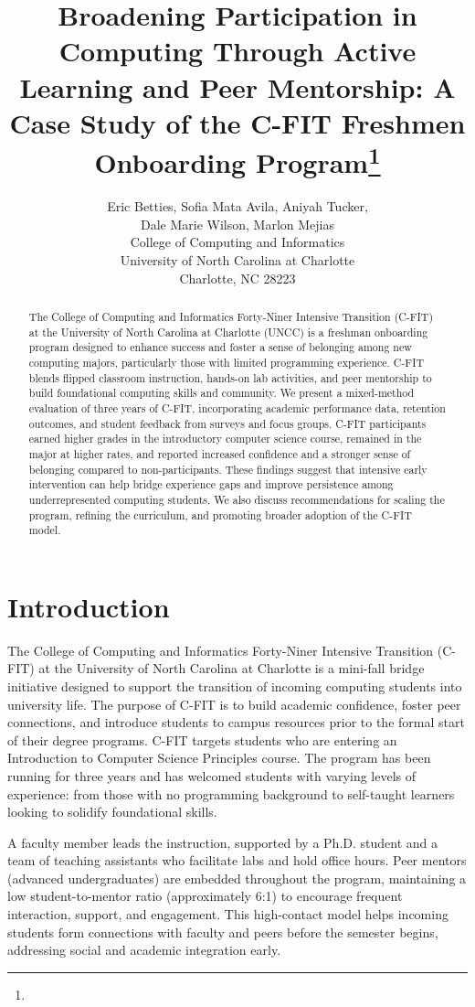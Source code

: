 \documentclass{article}
\title{Broadening Participation in Computing Through Active Learning and Peer Mentorship: A Case Study of the C-FIT Freshmen Onboarding Program\footnote{\protect}}
\author{
Eric Betties, Sofia Mata Avila, Aniyah Tucker,\\
Dale Marie Wilson, Marlon Mejias\\
College of Computing and Informatics\\
University of North Carolina at Charlotte\\
Charlotte, NC 28223\\
\email{\{ebetties,smataavi,atucke70,dwilso1,mmejias\}@charlotte.edu}
}
\begin{document}
\maketitle

\begin{abstract}
The College of Computing and Informatics Forty-Niner Intensive Transition (C-FIT) at the University of North Carolina at Charlotte (UNCC) is a freshman onboarding program designed to enhance success and foster a sense of belonging among new computing majors, particularly those with limited programming experience. C-FIT blends flipped classroom instruction, hands-on lab activities, and peer mentorship to build foundational computing skills and community. We present a mixed-method evaluation of three years of C-FIT, incorporating academic performance data, retention outcomes, and student feedback from surveys and focus groups. C-FIT participants earned higher grades in the introductory computer science course, remained in the major at higher rates, and reported increased confidence and a stronger sense of belonging compared to non-participants. These findings suggest that intensive early intervention can help bridge experience gaps and improve persistence among underrepresented computing students. We also discuss recommendations for scaling the program, refining the curriculum, and promoting broader adoption of the C-FIT model.
\end{abstract}

\section{Introduction}

The College of Computing and Informatics Forty-Niner Intensive Transition (C-FIT) at the University of North Carolina at Charlotte is a mini-fall bridge initiative designed to support the transition of incoming computing students into university life. The purpose of C-FIT is to build academic confidence, foster peer connections, and introduce students to campus resources prior to the formal start of their degree programs. C-FIT targets students who are entering an Introduction to Computer Science Principles course. The program has been running for three years and has welcomed students with varying levels of experience: from those with no programming background to self-taught learners looking to solidify foundational skills.

A faculty member leads the instruction, supported by a Ph.D. student and a team of teaching assistants who facilitate labs and hold office hours. Peer mentors (advanced undergraduates) are embedded throughout the program, maintaining a low student-to-mentor ratio (approximately 6:1) to encourage frequent interaction, support, and engagement. This high-contact model helps incoming students form connections with faculty and peers before the semester begins, addressing social and academic integration early.
\end{document}
